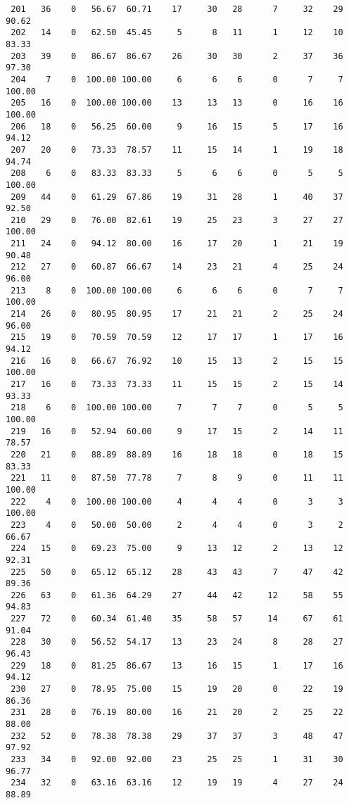 \begin{verbatim}
 201   36    0   56.67  60.71    17     30   28      7     32    29    90.62
 202   14    0   62.50  45.45     5      8   11      1     12    10    83.33
 203   39    0   86.67  86.67    26     30   30      2     37    36    97.30
 204    7    0  100.00 100.00     6      6    6      0      7     7   100.00
 205   16    0  100.00 100.00    13     13   13      0     16    16   100.00
 206   18    0   56.25  60.00     9     16   15      5     17    16    94.12
 207   20    0   73.33  78.57    11     15   14      1     19    18    94.74
 208    6    0   83.33  83.33     5      6    6      0      5     5   100.00
 209   44    0   61.29  67.86    19     31   28      1     40    37    92.50
 210   29    0   76.00  82.61    19     25   23      3     27    27   100.00
 211   24    0   94.12  80.00    16     17   20      1     21    19    90.48
 212   27    0   60.87  66.67    14     23   21      4     25    24    96.00
 213    8    0  100.00 100.00     6      6    6      0      7     7   100.00
 214   26    0   80.95  80.95    17     21   21      2     25    24    96.00
 215   19    0   70.59  70.59    12     17   17      1     17    16    94.12
 216   16    0   66.67  76.92    10     15   13      2     15    15   100.00
 217   16    0   73.33  73.33    11     15   15      2     15    14    93.33
 218    6    0  100.00 100.00     7      7    7      0      5     5   100.00
 219   16    0   52.94  60.00     9     17   15      2     14    11    78.57
 220   21    0   88.89  88.89    16     18   18      0     18    15    83.33
 221   11    0   87.50  77.78     7      8    9      0     11    11   100.00
 222    4    0  100.00 100.00     4      4    4      0      3     3   100.00
 223    4    0   50.00  50.00     2      4    4      0      3     2    66.67
 224   15    0   69.23  75.00     9     13   12      2     13    12    92.31
 225   50    0   65.12  65.12    28     43   43      7     47    42    89.36
 226   63    0   61.36  64.29    27     44   42     12     58    55    94.83
 227   72    0   60.34  61.40    35     58   57     14     67    61    91.04
 228   30    0   56.52  54.17    13     23   24      8     28    27    96.43
 229   18    0   81.25  86.67    13     16   15      1     17    16    94.12
 230   27    0   78.95  75.00    15     19   20      0     22    19    86.36
 231   28    0   76.19  80.00    16     21   20      2     25    22    88.00
 232   52    0   78.38  78.38    29     37   37      3     48    47    97.92
 233   34    0   92.00  92.00    23     25   25      1     31    30    96.77
 234   32    0   63.16  63.16    12     19   19      4     27    24    88.89

\end{verbatim}
